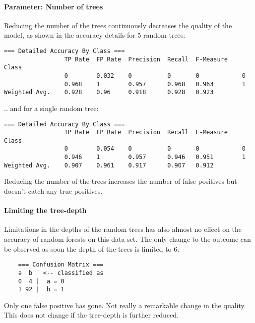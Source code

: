 \documentclass[paper=a4, fontsize=11pt]{scrartcl} %
\numberwithin{equation}{section} %
\numberwithin{figure}{section} %
\numberwithin{table}{section} %
\begin{document}
\paragraph{Parameter: Number of trees}
Reducing the number of the trees continuously decreases the quality of the model, as shown in the accuracy details for 5 random trees:
\begin{lstlisting}
=== Detailed Accuracy By Class ===
                 TP Rate  FP Rate  Precision  Recall  F-Measure    Class
                 0        0.032    0          0       0            0  
                 0.968    1        0.957      0.968   0.963        1   
Weighted Avg.    0.928    0.96     0.918      0.928   0.923    
\end{lstlisting}
.. and for a single random tree:
\begin{lstlisting}
=== Detailed Accuracy By Class ===
                 TP Rate  FP Rate  Precision  Recall  F-Measure    Class
                 0        0.054    0          0       0            0  
                 0.946    1        0.957      0.946   0.951        1   
Weighted Avg.    0.907    0.961    0.917      0.907   0.912    
\end{lstlisting}
Reducing the number of the trees increases the number of false positives but doesn't catch any true positives.
\paragraph{Limiting the tree-depth}
Limitations in the depths of the random trees has also almost no effect on the accuracy of random forests on this data set. The only change to the outcome can be observed as soon the depth of the trees is limited to 6:
\begin{lstlisting}
    === Confusion Matrix ===
    a  b   <-- classified as
    0  4 |  a = 0
    1 92 |  b = 1
\end{lstlisting}
Only one false positive has gone. Not really a remarkable change in the quality. This does not change if the tree-depth is further reduced.
\end{document}
